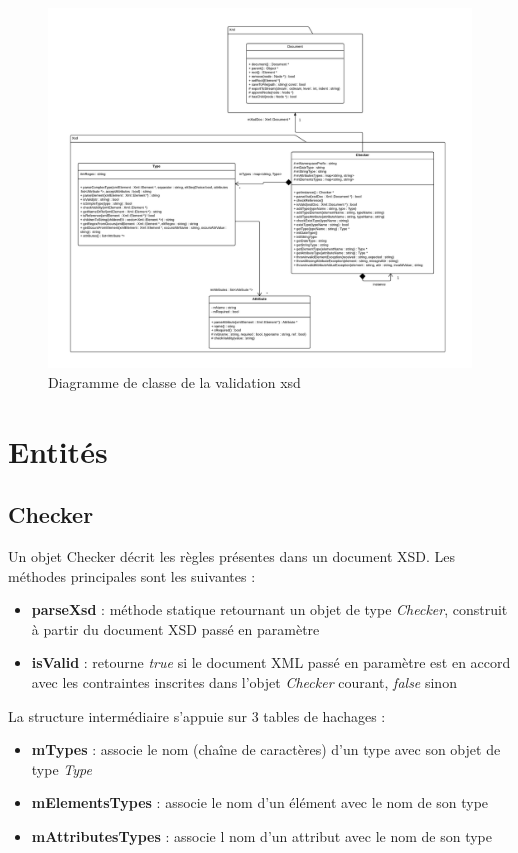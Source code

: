 \begin{landscape}
\begin{figure}[H]
	\centering
	\includegraphics[width=\linewidth]{images/xsd-uml.pdf}
	\caption{Diagramme de classe de la validation xsd}
	\label{xsdClassDiagram}
\end{figure}
\end{landscape}

\section{Entités}
	\subsection{Checker}
		Un objet Checker décrit les règles présentes dans un document XSD. Les méthodes principales sont les suivantes :
		\begin{itemize}
			\item \textbf{parseXsd} : méthode statique retournant un objet de type \textit{Checker},  construit à partir du document XSD passé en paramètre
			\item \textbf{isValid} : retourne \textit{true} si le document XML passé en paramètre est en accord avec les contraintes inscrites dans l'objet \textit{Checker} courant, \textit{false} sinon
		\end{itemize}
		
		La structure intermédiaire s'appuie sur 3 tables de hachages :
		\begin{itemize}
			\item \textbf{mTypes} : associe le nom (chaîne de caractères) d'un type avec son objet de type \textit{Type}
			\item \textbf{mElementsTypes} : associe le nom d'un élément avec le nom de son type
			\item \textbf{mAttributesTypes} : associe l nom d'un attribut avec le nom de son type
		\end{itemize}
		

